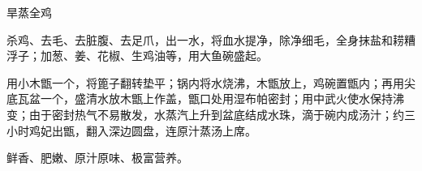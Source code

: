 \begin{recipe}{旱蒸全鸡}

\ingredients


\cooking

\step 杀鸡、去毛、去脏腹、去足爪，出一水，将血水提净，除净细毛，全身抹盐和耢糟浮子；加葱、姜、花椒、生鸡油等，用大鱼碗盛起。

\step 用小木甑一个，将篦子翻转垫平；锅内将水烧沸，木甑放上，鸡碗置甑内；再用尖底瓦盆一个，盛清水放木甑上作盖，甑口处用湿布帕密封；用中武火使水保持沸变；由于密封热气不易散发，水蒸汽上升到盆底结成水珠，滴于碗内成汤汁；约三小时鸡妃出甑，翻入深边圆盘，连原汁蒸汤上席。

\notes

鲜香、肥嫩、原汁原味、极富营养。

\end{recipe}

